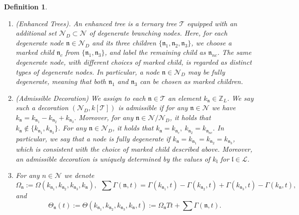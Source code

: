 \documentclass[UTF-8,reqno]{amsart}
\numberwithin{equation}{section}
\newtheorem{definition}[theorem]{Definition}
\theoremstyle{definition}
\begin{document}
 \begin{definition} \label{def:enhancedtress}
\begin{enumerate}
\item  (Enhanced Trees). An enhanced tree is a ternary tree $\mathcal{T}$ equipped with an additional set $\mathcal{N}_D\subset \mathcal{N}$ of degenerate branching nodes. Here, for each degenerate node $\mathfrak{n}\in \mathcal{N}_D$ and its three children $\{\mathfrak{n}_1,\mathfrak{n}_2,\mathfrak{n}_3\}$, we choose a marked child $\mathfrak{n}_c$ from $\{\mathfrak{n}_1,\mathfrak{n}_3\}$, and label
 the remaining child   as $\mathfrak{n}_{nc}$. The same degenerate node, with different choices of marked child, is regarded as distinct types of degenerate nodes. In particular, a node $\mathfrak{n}\in\mathcal{N}_D$ may be fully degenerate, meaning that both $\mathfrak{n}_1$ and $\mathfrak{n}_3$ can be chosen as marked children.
\item (Admissible Decoration) We assign to each $\mathfrak{n}\in\mathcal{T}$ an element $k_{\mathfrak{n}}\in\mathbb{Z}_L$. We say such a decoration $(\mathcal{N}_D,k[\mathcal{T}])$ is admissible if for any $\mathfrak{n}\in\mathcal{N}$ we have $k_{\mathfrak{n}}=k_{\mathfrak{n}_1}-k_{\mathfrak{n}_2}+k_{\mathfrak{n}_3}.$
Moreover, for any $\mathfrak{n}\in\mathcal{N}/\mathcal{N}_D$, it holds that  $k_{\mathfrak{n}}\not\in\{k_{\mathfrak{n}_1},k_{\mathfrak{n}_3}\}$. For any $\mathfrak{n}\in \mathcal{N}_D$, it holds that    $k_{\mathfrak{n}}=k_{\mathfrak{n}_c},\ k_{\mathfrak{n}_2}=k_{\mathfrak{n}_{nc}}.$ In particular, we say that a node is fully degenerate if $k_{\mathfrak{n}}=k_{\mathfrak{n}_1}=k_{\mathfrak{n}_2}=k_{\mathfrak{n}_3}$, which is consistent with the choice of marked child described above. 
 Moreover, an admissible decoration is uniquely determined by the values of $k_{\mathfrak{l}}$ for $\mathfrak{l}\in\mathcal{L}$.  
\item  For any $n\in\mathcal{N}$ we denote $$\Omega_{\mathfrak{n}}:=\Omega(k_{\mathfrak{n}_1},k_{\mathfrak{n}_2},k_{\mathfrak{n}_3},k_{\mathfrak{n}}),\  \ \sum\Gamma(\mathfrak{n},t)= \Gamma(k_{\mathfrak{n}_1},t)- \Gamma(k_{\mathfrak{n}_2},t)+ \Gamma(k_{\mathfrak{n}_3},t)- \Gamma(k_{\mathfrak{n}},t),$$ and $$\Theta_{\mathfrak{n}}(t):=\Theta(k_{\mathfrak{n}_1},k_{\mathfrak{n}_2},k_{\mathfrak{n}_3},k_{\mathfrak{n}},t):=\Omega_{\mathfrak{n}}Tt+\sum\Gamma(\mathfrak{n},t).$$ %

\end{enumerate}
\end{definition}
\end{document}
